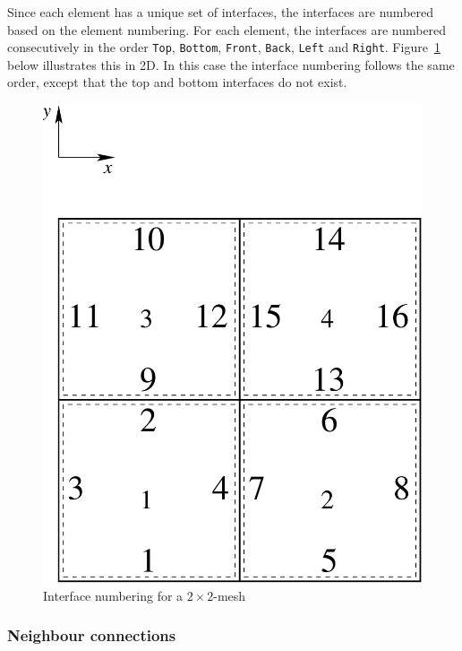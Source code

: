 Since each element has a unique set of interfaces, the interfaces are
numbered based on the element numbering. For each element, the
interfaces are numbered consecutively in the order \texttt{Top},
\texttt{Bottom}, \texttt{Front}, \texttt{Back}, \texttt{Left} and
\texttt{Right}. Figure~\ref{fig:intfnumber} below illustrates this in
2D. In this case the interface numbering follows the same order,
except that the top and bottom interfaces do not exist. 
%
\begin{figure}
  \centering
  \includegraphics[scale=0.3]{../figures/intfnum2d}
  \caption{Interface numbering for a $2 \times 2$-mesh}
  \label{fig:intfnumber}
\end{figure}
%

\subsubsection{Neighbour connections}

